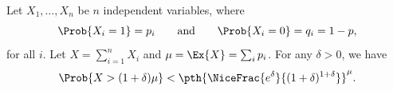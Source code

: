 \begin{theorem}
        Let $X_1, \ldots, X_n$ be $n$ independent variables, where
        \begin{equation*}
            \Prob{ \bigl. X_i = 1 } =p_i
            \qquad\text{and}\qquad
            \Prob{ \bigl. X_i = 0 } =q_i = 1-p,
        \end{equation*}
        for all $i$.  Let $X = \sum_{i=1}^{n} X_i$ and
        $\mu = \Ex{\bigl. X} = \sum_i p_i$.  For any $\delta > 0$, we have
        \begin{equation*}
            \Prob{ \bigl. X > (1+\delta)\mu } < \pth{
               \NiceFrac{e^\delta}{(1+\delta)^{1+\delta}}}^\mu.
        \end{equation*}


    \end{theorem}%
